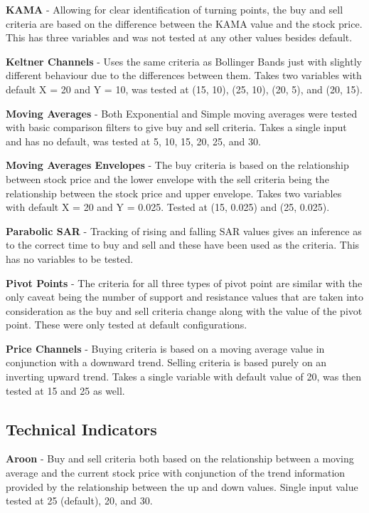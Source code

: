 \documentclass[conference]{IEEEtran}
\begin{document}
\textbf{KAMA} - Allowing for clear identification of turning points, the buy and sell criteria are based on the difference between the KAMA value and the stock price. This has three variables and was not tested at any other values besides default.

\textbf{Keltner Channels} - Uses the same criteria as Bollinger Bands just with slightly different behaviour due to the differences between them. Takes two variables with default X = 20 and Y = 10, was tested at (15, 10), (25, 10), (20, 5), and (20, 15).

\textbf{Moving Averages} - Both Exponential and Simple moving averages were tested with basic comparison filters to give buy and sell criteria. Takes a single input and has no default, was tested at 5, 10, 15, 20, 25, and 30.

\textbf{Moving Averages Envelopes} - The buy criteria is based on the relationship between stock price and the lower envelope with the sell criteria being the relationship between the stock price and upper envelope. Takes two variables with default X = 20 and Y = 0.025. Tested at (15, 0.025) and (25, 0.025).

\textbf{Parabolic SAR} - Tracking of rising and falling SAR values gives an inference as to the correct time to buy and sell and these have been used as the criteria. This has no variables to be tested.

\textbf{Pivot Points} - The criteria for all three types of pivot point are similar with the only caveat being the number of support and resistance values that are taken into consideration as the buy and sell criteria change along with the value of the pivot point. These were only tested at default configurations.

\textbf{Price Channels} - Buying criteria is based on a moving average value in conjunction with a downward trend. Selling criteria is based purely on an inverting upward trend. Takes a single variable with default value of 20, was then tested at 15 and 25 as well.

\subsection{Technical Indicators}

\textbf{Aroon} - Buy and sell criteria both based on the relationship between a moving average and the current stock price with conjunction of the trend information provided by the relationship between the up and down values. Single input value tested at 25 (default), 20, and 30.
\end{document}
